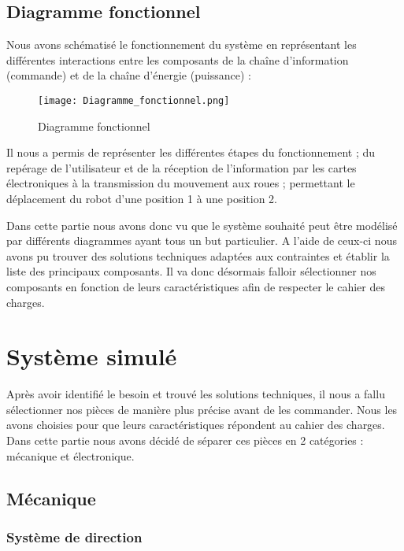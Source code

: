 \documentclass[12pt,a4paper]{article}
\begin{document}
\subsection{Diagramme fonctionnel}

\indent \indent Nous avons schématisé le fonctionnement du système en représentant les différentes interactions entre les composants de la chaîne d'information (commande) et de la chaîne d'énergie (puissance) :
	\begin{figure}[ht!]
		\centering
			\texttt{[image: Diagramme\_fonctionnel.png]}
			\caption[Diagramme fonctionnel - Illustration réalisée par notre groupe, disponible à l'adresse : \url{https://github.com/thaspdev/PATRICK/illustrations/Diagramme_fonctionnel.png}]{Diagramme fonctionnel\label{overflow}}
	\end{figure}
	
Il nous a permis de représenter les différentes étapes du fonctionnement ; du repérage de l'utilisateur et de la réception de l'information par les cartes électroniques à la transmission du mouvement aux roues ; permettant le déplacement du robot d'une position 1 à une position 2.

Dans cette partie nous avons donc vu que le système souhaité peut être modélisé par différents diagrammes ayant tous un but particulier. A l'aide de ceux-ci nous avons pu trouver des solutions techniques adaptées aux contraintes et établir la liste des principaux composants. Il va donc désormais falloir sélectionner nos composants en fonction de leurs caractéristiques afin de respecter le cahier des charges.
	\newpage
	\section{Système simulé}
\indent \indent Après avoir identifié le besoin et trouvé les solutions techniques, il nous a fallu sélectionner nos pièces de manière plus précise avant de les commander. Nous les avons choisies pour que leurs caractéristiques répondent au cahier des charges. Dans cette partie nous avons décidé de séparer ces pièces en 2 catégories : mécanique et électronique.
	
	\subsection{Mécanique}
	
	\subsubsection{Système de direction}
	
\end{document}
